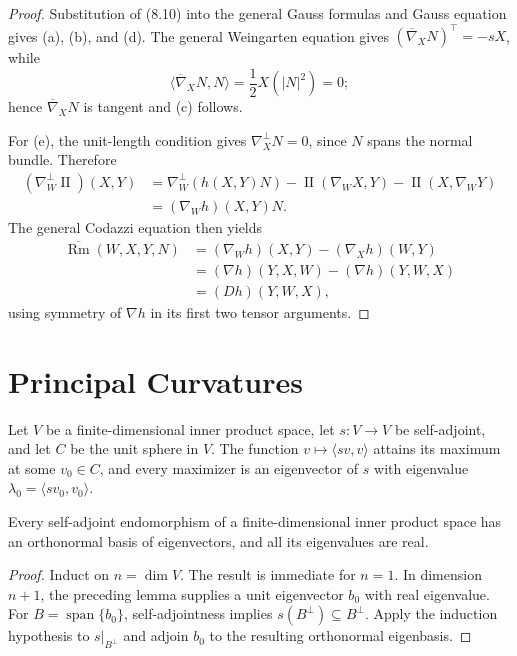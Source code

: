 \begin{proof}
\sketch Substitution of (8.10) into the general Gauss formulas and Gauss
equation gives (a), (b), and (d). The general Weingarten equation gives
$(\overline\nabla_XN)^\top=-sX$, while
\[
\langle\overline\nabla_XN,N\rangle
=\frac12X(|N|^2)=0;
\]
hence $\overline\nabla_XN$ is tangent and (c) follows.

For (e), the unit-length condition gives
$\nabla_X^\perp N=0$, since $N$ spans the normal bundle. Therefore
\begin{align*}
(\nabla_W^\perp\operatorname{II})(X,Y)
&=\nabla_W^\perp(h(X,Y)N)
  -\operatorname{II}(\nabla_WX,Y)
  -\operatorname{II}(X,\nabla_WY)\\
&=(\nabla_Wh)(X,Y)N.
\end{align*}
The general Codazzi equation then yields
\begin{align*}
\overline{\operatorname{Rm}}(W,X,Y,N)
&=(\nabla_Wh)(X,Y)-(\nabla_Xh)(W,Y)\\
&=(\nabla h)(Y,X,W)-(\nabla h)(Y,W,X)\\
&=(Dh)(Y,W,X),
\end{align*}
using symmetry of $\nabla h$ in its first two tensor arguments.
\end{proof}

\section{Principal Curvatures}

\begin{lemma}
\label{lem:self-adjoint-eigenvector-extremum}
Let $V$ be a finite-dimensional inner product space, let
$s\colon V\to V$ be self-adjoint, and let $C$ be the unit sphere in $V$.
The function $v\mapsto\langle sv,v\rangle$ attains its maximum at some
$v_0\in C$, and every maximizer is an eigenvector of $s$ with eigenvalue
$\lambda_0=\langle sv_0,v_0\rangle$.
\end{lemma}

\begin{proposition}
\label{prop:finite-dimensional-spectral-theorem}
Every self-adjoint endomorphism of a finite-dimensional inner product space
has an orthonormal basis of eigenvectors, and all its eigenvalues are real.
\end{proposition}

\begin{proof}
\sketch Induct on $n=\dim V$. The result is immediate for $n=1$. In dimension
$n+1$, the preceding lemma supplies a unit eigenvector $b_0$ with real
eigenvalue. For $B=\operatorname{span}\{b_0\}$, self-adjointness implies
$s(B^\perp)\subseteq B^\perp$. Apply the induction hypothesis to
$s|_{B^\perp}$ and adjoin $b_0$ to the resulting orthonormal eigenbasis.
\end{proof}


